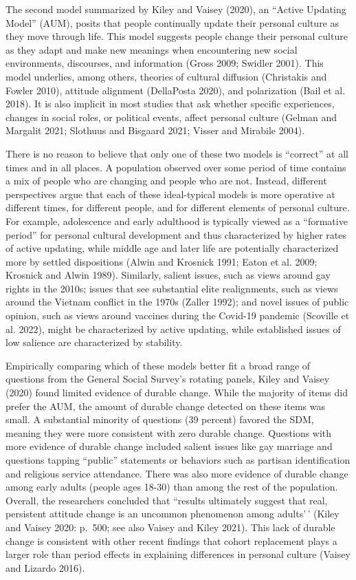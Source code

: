 \documentclass[
  11pt,
]{article}
\begin{document}
The second model summarized by Kiley and Vaisey (2020), an ``Active
Updating Model'' (AUM), posits that people continually update their
personal culture as they move through life. This model suggests people
change their personal culture as they adapt and make new meanings when
encountering new social environments, discourses, and information (Gross
2009; Swidler 2001). This model underlies, among others, theories of
cultural diffusion (Christakis and Fowler 2010), attitude alignment
(DellaPosta 2020), and polarization (Bail et al. 2018). It is also
implicit in most studies that ask whether specific experiences, changes
in social roles, or political events, affect personal culture (Gelman
and Margalit 2021; Slothuus and Bisgaard 2021; Visser and Mirabile
2004).

There is no reason to believe that only one of these two models is
``correct'' at all times and in all places. A population observed over
some period of time contains a mix of people who are changing and people
who are not. Instead, different perspectives argue that each of these
ideal-typical models is more operative at different times, for different
people, and for different elements of personal culture. For example,
adolescence and early adulthood is typically viewed as a ``formative
period'' for personal cultural development and thus characterized by
higher rates of active updating, while middle age and later life are
potentially characterized more by settled dispositions (Alwin and
Krosnick 1991; Eaton et al. 2009; Krosnick and Alwin 1989). Similarly,
salient issues, such as views around gay rights in the 2010s; issues
that see substantial elite realignments, such as views around the
Vietnam conflict in the 1970s (Zaller 1992); and novel issues of public
opinion, such as views around vaccines during the Covid-19 pandemic
(Scoville et al. 2022), might be characterized by active updating, while
established issues of low salience are characterized by stability.

Empirically comparing which of these models better fit a broad range of
questions from the General Social Survey's rotating panels, Kiley and
Vaisey (2020) found limited evidence of durable change. While the
majority of items did prefer the AUM, the amount of durable change
detected on these items was small. A substantial minority of questions
(39 percent) favored the SDM, meaning they were more consistent with
zero durable change. Questions with more evidence of durable change
included salient issues like gay marriage and questions tapping
``public'' statements or behaviors such as partisan identification and
religious service attendance. There was also more evidence of durable
change among early adults (people ages 18-30) than among the rest of the
population. Overall, the researchers concluded that ``results ultimately
suggest that real, persistent attitude change is an uncommon phenomenon
among adults'\,' (Kiley and Vaisey 2020: p.~500; see also Vaisey and
Kiley 2021). This lack of durable change is consistent with other recent
findings that cohort replacement plays a larger role than period effects
in explaining differences in personal culture (Vaisey and Lizardo 2016).
\end{document}
